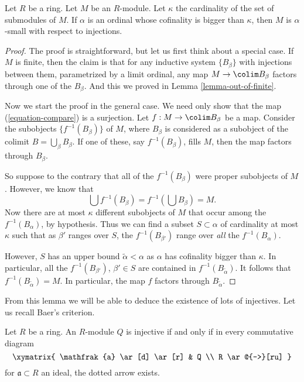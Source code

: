 \begin{proposition}
\label{proposition-modules-are-small}
Let $R$ be a ring. Let $M$ be an $R$-module.
Let $\kappa$ the cardinality of the set of submodules of $M$.
If $\alpha$ is an ordinal whose cofinality is bigger than $\kappa$,
then $M$ is $\alpha$-small with respect to injections.
\end{proposition}

\begin{proof}
The proof is straightforward, but let us first think about a special case.
If $M$ is finite, then the claim is that for any inductive system
$\{B_\beta\}$ with injections between them, parametrized by a
limit ordinal, any map $M \to \colim B_\beta$ factors through one of
the $B_\beta$. And this we proved in
Lemma \ref{lemma-out-of-finite}.

\medskip\noindent
Now we start the proof in the general case.
We need only show that the map (\ref{equation-compare}) is a surjection.
Let $f : M \to \colim B_\beta$ be a map.
Consider the subobjects $\{f^{-1}(B_\beta)\}$ of $M$, where $B_\beta$
is considered as a subobject of the colimit $B = \bigcup_\beta B_\beta$.
If one of these, say $f^{-1}(B_\beta)$, fills $M$,
then the map factors through $B_\beta$.

\medskip\noindent
So suppose to the contrary that all of the $f^{-1}(B_\beta)$ were proper
subobjects of $M$. However, we know that
$$
\bigcup f^{-1}(B_\beta) = f^{-1}\left(\bigcup B_\beta\right) = M.
$$
Now there are at most $\kappa$ different subobjects of $M$ that occur among
the $f^{-1}(B_\alpha)$, by hypothesis.
Thus we can find a subset $S \subset \alpha$ of cardinality at most
$\kappa$ such that as $\beta'$ ranges over $S$, the
$f^{-1}(B_{\beta'})$ range over \emph{all} the $f^{-1}(B_\alpha)$.

\medskip\noindent
However, $S$ has an upper bound $\widetilde{\alpha} < \alpha$ as
$\alpha$ has cofinality bigger than $\kappa$. In particular, all the
$f^{-1}(B_{\beta'})$, $\beta' \in S$ are contained in
$f^{-1}(B_{\widetilde{\alpha}})$.
It follows that $f^{-1}(B_{\widetilde{\alpha}}) = M$.
In particular, the map $f$ factors through $B_{\widetilde{\alpha}}$.
\end{proof}

\noindent
From this lemma we will be able to deduce the existence of lots of injectives.
Let us recall Baer's criterion.

\begin{lemma}
\label{lemma-criterion-baer}
\begin{reference}
\cite[Theorem 1]{Baer}
\end{reference}
Let $R$ be a ring. An $R$-module $Q$ is injective if and only if in every
commutative diagram
$$
\xymatrix{
\mathfrak{a} \ar[d] \ar[r] &  Q \\
R \ar@{-->}[ru]
}
$$
for $\mathfrak{a} \subset R$ an ideal, the dotted arrow exists.
\end{lemma}

